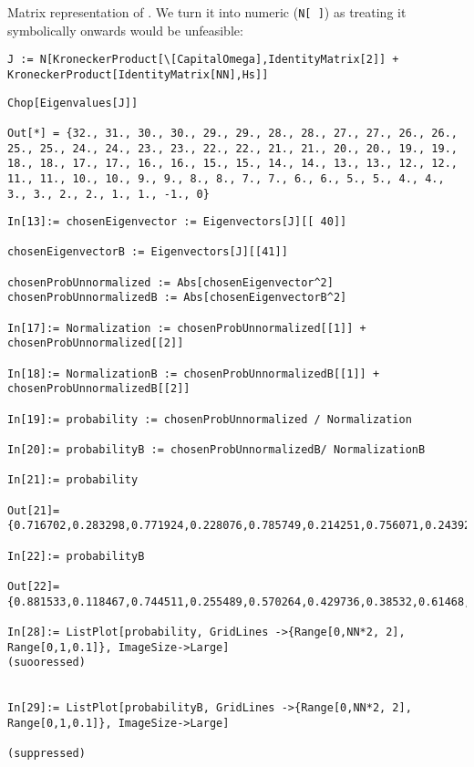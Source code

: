 Matrix representation of \cite[eq. 1]{Lloyd:Time}.
We turn it into numeric (\verb!N[ ]!) as treating  it symbolically onwards would be unfeasible:
\begin{lstlisting}
J := N[KroneckerProduct[\[CapitalOmega],IdentityMatrix[2]] + KroneckerProduct[IdentityMatrix[NN],Hs]]
\end{lstlisting}
\begin{lstlisting}
Chop[Eigenvalues[J]]

Out[*] = {32., 31., 30., 30., 29., 29., 28., 28., 27., 27., 26., 26., 25., 25., 24., 24., 23., 23., 22., 22., 21., 21., 20., 20., 19., 19., 18., 18., 17., 17., 16., 16., 15., 15., 14., 14., 13., 13., 12., 12., 11., 11., 10., 10., 9., 9., 8., 8., 7., 7., 6., 6., 5., 5., 4., 4., 3., 3., 2., 2., 1., 1., -1., 0}
\end{lstlisting}
\begin{lstlisting}
In[13]:= chosenEigenvector := Eigenvectors[J][[ 40]]

chosenEigenvectorB := Eigenvectors[J][[41]]

chosenProbUnnormalized := Abs[chosenEigenvector^2]
chosenProbUnnormalizedB := Abs[chosenEigenvectorB^2]

In[17]:= Normalization := chosenProbUnnormalized[[1]] + chosenProbUnnormalized[[2]]

In[18]:= NormalizationB := chosenProbUnnormalizedB[[1]] + chosenProbUnnormalizedB[[2]]

In[19]:= probability := chosenProbUnnormalized / Normalization

In[20]:= probabilityB := chosenProbUnnormalizedB/ NormalizationB

In[21]:= probability

Out[21]= {0.716702,0.283298,0.771924,0.228076,0.785749,0.214251,0.756071,0.243929,0.687408,0.312592,0.590214,0.409786,0.479286,0.520714,0.371512,0.628488,0.283298,0.716702,0.228076,0.771924,0.214251,0.785749,0.243929,0.756071,0.312592,0.687408,0.409786,0.590214,0.520714,0.479286,0.628488,0.371512,0.716702,0.283298,0.771924,0.228076,0.785749,0.214251,0.756071,0.243929,0.687408,0.312592,0.590214,0.409786,0.479286,0.520714,0.371512,0.628488,0.283298,0.716702,0.228076,0.771924,0.214251,0.785749,0.243929,0.756071,0.312592,0.687408,0.409786,0.590214,0.520714,0.479286,0.628488,0.371512}

In[22]:= probabilityB

Out[22]= {0.881533,0.118467,0.744511,0.255489,0.570264,0.429736,0.38532,0.61468,0.217835,0.782165,0.0933066,0.906693,0.0306941,0.969306,0.0395291,0.960471,0.118467,0.881533,0.255489,0.744511,0.429736,0.570264,0.61468,0.38532,0.782165,0.217835,0.906693,0.0933066,0.969306,0.0306941,0.960471,0.0395291,0.881533,0.118467,0.744511,0.255489,0.570264,0.429736,0.38532,0.61468,0.217835,0.782165,0.0933066,0.906693,0.0306941,0.969306,0.0395291,0.960471,0.118467,0.881533,0.255489,0.744511,0.429736,0.570264,0.61468,0.38532,0.782165,0.217835,0.906693,0.0933066,0.969306,0.0306941,0.960471,0.0395291}

In[28]:= ListPlot[probability, GridLines ->{Range[0,NN*2, 2], Range[0,1,0.1]}, ImageSize->Large]
(suooressed)


In[29]:= ListPlot[probabilityB, GridLines ->{Range[0,NN*2, 2], Range[0,1,0.1]}, ImageSize->Large]

(suppressed)

\end{lstlisting}